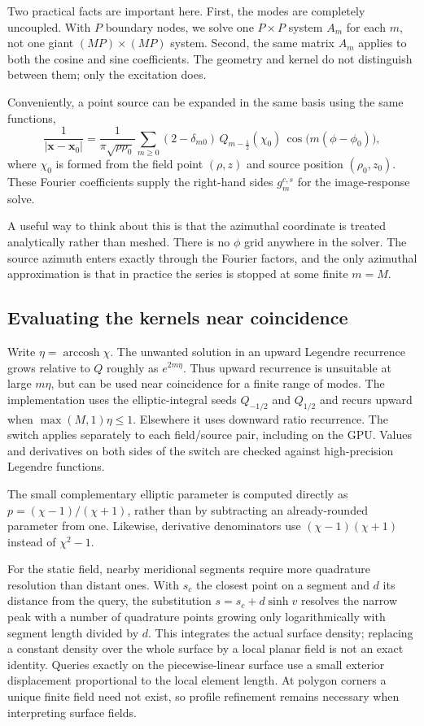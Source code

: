 \documentclass[11pt]{article}
\begin{document}
Two practical facts are important here.  First, the modes are completely
uncoupled.  With $P$ boundary nodes, we solve one $P\times P$ system $A_m$ for
each $m$, not one giant $(MP)\times(MP)$ system.  Second, the same matrix $A_m$
applies to both the cosine and sine coefficients.  The geometry and kernel do
not distinguish between them; only the excitation does.

Conveniently, a point source can be expanded in the same basis using the same functions,
\begin{equation}
  \frac{1}{|\mathbf{x}-\mathbf{x}_0|}
  = \frac{1}{\pi\sqrt{\rho\rho_0}}
    \sum_{m\ge 0} (2-\delta_{m0})\, Q_{m-\frac12}(\chi_0)\,
    \cos\!\big(m(\phi-\phi_0)\big),
  \label{eq:point-expansion}
\end{equation}
where $\chi_0$ is formed from the field point $(\rho,z)$ and source position
$(\rho_0,z_0)$.  These Fourier coefficients supply the right-hand sides $g_m^{c,s}$ for the
image-response solve.

A useful way to think about this is that the azimuthal coordinate is treated
analytically rather than meshed.  There is no $\phi$ grid anywhere in the
solver.  The source azimuth enters exactly through the Fourier factors, and the
only azimuthal approximation is that in practice the series is stopped at some
finite $m=M$.

\subsection{Evaluating the kernels near coincidence}

Write $\eta=\operatorname{arccosh}\chi$. The unwanted solution in an upward
Legendre recurrence grows relative to $Q$ roughly as $e^{2m\eta}$. Thus
upward recurrence is unsuitable at large $m\eta$, but can be used near
coincidence for a finite range of modes. The implementation uses the
elliptic-integral seeds $Q_{-1/2}$ and $Q_{1/2}$ and recurs upward when
$\max(M,1)\eta\leq1$. Elsewhere it uses downward ratio recurrence.
The switch applies separately to each field/source pair, including on the
GPU. Values and derivatives on both sides of the switch are checked
against high-precision Legendre functions.

The small complementary elliptic parameter is computed directly as
$p=(\chi-1)/(\chi+1)$, rather than by subtracting an already-rounded
parameter from one. Likewise, derivative denominators use
$(\chi-1)(\chi+1)$ instead of $\chi^2-1$.

For the static field, nearby meridional segments require more quadrature
resolution than distant ones. With $s_c$ the closest point on a segment
and $d$ its distance from the query, the substitution
$s=s_c+d\sinh v$ resolves the narrow peak with a number of quadrature
points growing only logarithmically with segment length divided by $d$.
This integrates the actual surface density; replacing a constant density
over the whole surface by a local planar field is not an exact identity.
Queries exactly on the piecewise-linear surface use a small exterior
displacement proportional to the local element length. At polygon
corners a unique finite field need not exist, so profile refinement
remains necessary when interpreting surface fields.
\end{document}
